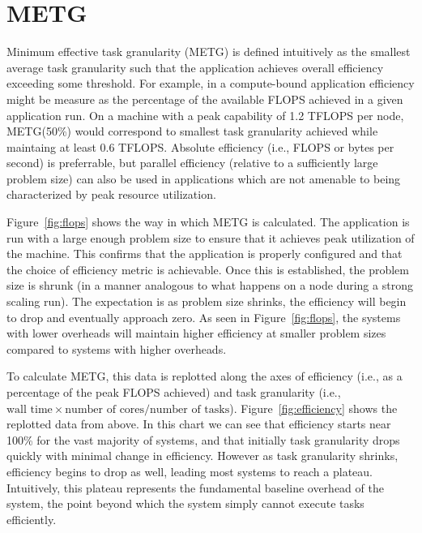 \section{METG}
\label{sec:metg}




Minimum effective task granularity (METG) is defined intuitively as
the smallest average task granularity such that the application
achieves overall efficiency exceeding some threshold. For example, in
a compute-bound application efficiency might be measure as the
percentage of the available FLOPS achieved in a given application
run. On a machine with a peak capability of 1.2 TFLOPS per node,
METG(50\%) would correspond to smallest task granularity achieved
while maintaing at least 0.6 TFLOPS. Absolute efficiency (i.e., FLOPS
or bytes per second) is preferrable, but parallel efficiency (relative
to a sufficiently large problem size) can also be used in applications
which are not amenable to being characterized by peak resource
utilization.

Figure~\ref{fig:flops} shows the way in which METG is calculated. The
application is run with a large enough problem size to ensure that it
achieves peak utilization of the machine. This confirms that the
application is properly configured and that the choice of efficiency
metric is achievable. Once this is established, the problem size is
shrunk (in a manner analogous to what happens on a node during a
strong scaling run). The expectation is as problem size shrinks, the
efficiency will begin to drop and eventually approach zero. As seen in
Figure~\ref{fig:flops}, the systems with lower overheads will maintain
higher efficiency at smaller problem sizes compared to systems with
higher overheads.

To calculate METG, this data is replotted along the axes of efficiency
(i.e., as a percentage of the peak FLOPS achieved) and task
granularity (i.e., $\text{wall time} \times \text{number of
  cores}/\text{number of tasks}$). Figure~\ref{fig:efficiency} shows
the replotted data from above. In this chart we can see that
efficiency starts near 100\% for the vast majority of systems, and
that initially task granularity drops quickly with minimal change in
efficiency. However as task granularity shrinks, efficiency begins to
drop as well, leading most systems to reach a plateau. Intuitively,
this plateau represents the fundamental baseline overhead of the
system, the point beyond which the system simply cannot execute tasks
efficiently.

